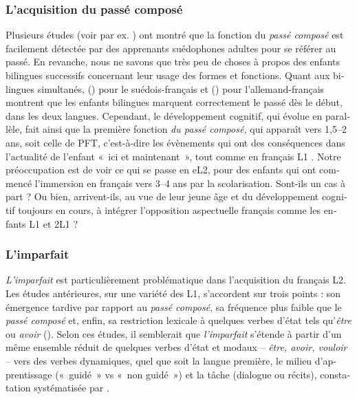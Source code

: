 \documentclass[french, output=paper]{langscibook}
\begin{document}
\begin{otherlanguage}{french}
\subsubsection{L’acquisition du passé composé}\label{sec:kihlstedt:1.2.1}

Plusieurs études (voir par ex. \citealt{Kihlstedt2002, BartningSchlyter2004}) ont montré que la fonction du \textit{passé composé} est facilement détectée par des apprenants suédophones adultes pour se référer au passé. En revanche, nous ne savons que très peu de choses à propos des enfants bilingues successifs concernant leur usage des formes et fonctions. Quant aux bilingues simultanés, \citeauthor{Schlyter1990} (\citeyear{Schlyter1990}) pour le suédois-français et \citeauthor{Rieckborn2007} (\citeyear{Rieckborn2007}) pour l'allemand-français montrent que les enfants bilingues marquent correctement le passé dès le début, dans les deux langues. Cependant, le développement cognitif, qui évolue en parallèle, fait ainsi que la première fonction \textit{du passé composé,} qui apparaît vers 1,5--2 ans, soit celle de PFT, c’est-à-dire les évènements qui ont des conséquences dans l’actualité de l’enfant «~ici et maintenant~», tout comme en français L1 \citep{Sabeau-Jouannet1977}. Notre préoccupation est de voir ce qui se passe en eL2, pour des enfants qui ont commencé l’immersion en français vers 3--4 ans par la scolarisation. Sont-ils un cas à part ? Ou bien, arrivent-ils, au vue de leur jeune âge et du développement cognitif toujours en cours, à intégrer l’opposition aspectuelle français comme les enfants L1 et 2L1 ? 


\subsubsection{L’imparfait}\label{sec:kihlstedt:1.2.2}

\textit{L’imparfait} est particulièrement problématique dans l’acquisition du français L2. Les études antérieures, sur une variété des L1, s’accordent sur trois points : son émergence tardive par rapport au \textit{passé composé}, sa fréquence plus faible que le \textit{passé composé} et, enfin, sa restriction lexicale à quelques verbes d’état tels qu’\textit{être} ou \textit{avoir} (\citealt{Devitt1992, Harley1992, DietrichEtAl1995, Bergström1997, Paprocka2000, Kihlstedt2002, Ayoun2004, Salaberry2008, Izquierdo2009, Kihlstedt2009, McManus2013, Kihlstedt2015}). Selon ces études, il semblerait que \textit{l’imparfait} s’étende à partir d’un même ensemble réduit de quelques verbes d’état et modaux -- \textit{être, avoir, vouloir --} vers des verbes dynamiques, quel que soit la langue première, le milieu d’apprentissage («~guidé~» vs «~non guidé~») et la tâche (dialogue ou récits), constatation systématisée par \citet[186]{Véronique2009}. 




\end{otherlanguage}
\end{document}
